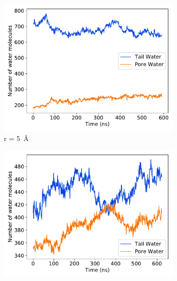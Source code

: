 \documentclass{article}
\begin{document}
  \begin{figure}[!htb]
  \centering
  \begin{subfigure}{0.45\textwidth}
  \includegraphics[width=\linewidth]{r5_gap.pdf}
  \caption{r = 5~\AA}\label{fig:r5_gap}
  \end{subfigure}
  \begin{subfigure}{0.45\textwidth}
  \includegraphics[width=\linewidth]{r6_gap.pdf}

\end{subfigure}
\end{figure}
\end{document}
